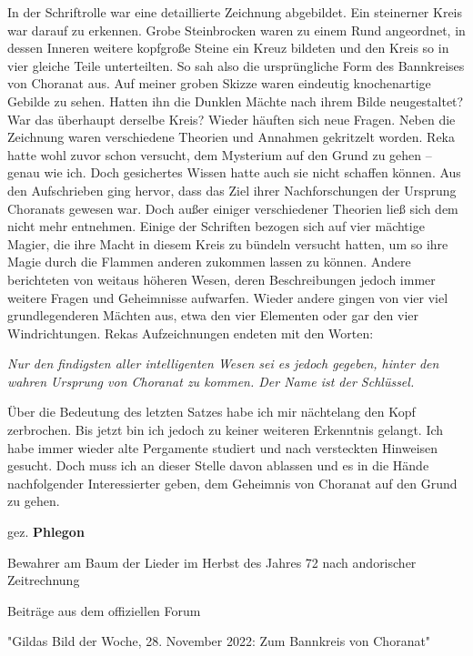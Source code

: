 \documentclass[10pt, a4paper, oneside]{book}
\begin{document}
\begin{multicols}{2}
In der Schriftrolle war eine detaillierte Zeichnung abgebildet. Ein steinerner Kreis war darauf zu erkennen. Grobe Steinbrocken waren zu einem Rund angeordnet, in dessen Inneren weitere kopfgroße Steine ein Kreuz bildeten und den Kreis so in vier gleiche Teile unterteilten. So sah also die ursprüngliche Form des Bannkreises von Choranat aus. Auf meiner groben Skizze waren eindeutig knochenartige Gebilde zu sehen. Hatten ihn die Dunklen Mächte nach ihrem Bilde neugestaltet? War das überhaupt derselbe Kreis? Wieder häuften sich neue Fragen. Neben die Zeichnung waren verschiedene Theorien und Annahmen gekritzelt worden. Reka hatte wohl zuvor schon versucht, dem Mysterium auf den Grund zu gehen – genau wie ich. Doch gesichertes Wissen hatte auch sie nicht schaffen können. Aus den Aufschrieben ging hervor, dass das Ziel ihrer Nachforschungen der Ursprung Choranats gewesen war. Doch außer einiger verschiedener Theorien ließ sich dem nicht mehr entnehmen. Einige der Schriften bezogen sich auf vier mächtige Magier, die ihre Macht in diesem Kreis zu bündeln versucht hatten, um so ihre Magie durch die Flammen anderen zukommen lassen zu können. Andere berichteten von weitaus höheren Wesen, deren Beschreibungen jedoch immer weitere Fragen und Geheimnisse aufwarfen. Wieder andere gingen von vier viel grundlegenderen Mächten aus, etwa den vier Elementen oder gar den vier Windrichtungen. Rekas Aufzeichnungen endeten mit den Worten:\bigskip

\begin{center}
    \textit{Nur den findigsten aller intelligenten Wesen sei es jedoch gegeben, hinter den wahren Ursprung von Choranat zu kommen. Der Name ist der Schlüssel.}
\end{center}


Über die Bedeutung des letzten Satzes habe ich mir nächtelang den Kopf zerbrochen. Bis jetzt bin ich jedoch zu keiner weiteren Erkenntnis gelangt. Ich habe immer wieder alte Pergamente studiert und nach versteckten Hinweisen gesucht. Doch muss ich an dieser Stelle davon ablassen und es in die Hände nachfolgender Interessierter geben, dem Geheimnis von Choranat auf den Grund zu gehen.\bigskip

gez. \textbf{Phlegon}

Bewahrer am Baum der Lieder im Herbst des Jahres 72 nach andorischer Zeitrechnung

\begin{center}
    Beiträge aus dem offiziellen Forum

    "Gildas Bild der Woche, 28. November 2022: Zum Bannkreis von Choranat"
\end{center}


\end{multicols}
\end{document}
